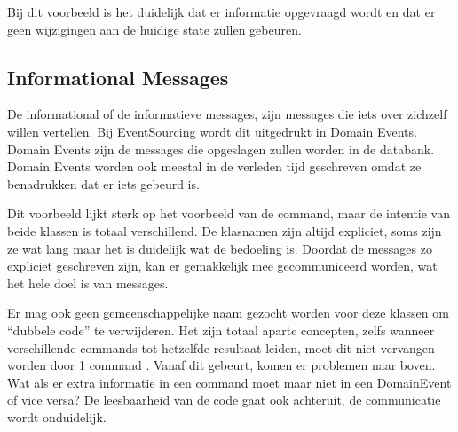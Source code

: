
Bij dit voorbeeld is het duidelijk dat er informatie opgevraagd wordt en dat er geen wijzigingen aan de huidige \gls{state} zullen gebeuren.

\subsection{Informational Messages}
\label{subsec:informational-messages}

De informational of de informatieve messages, zijn messages die iets over zichzelf willen vertellen. Bij EventSourcing wordt dit uitgedrukt in Domain Events. Domain Events zijn de messages die opgeslagen zullen worden in de databank. Domain Events worden ook meestal in de verleden tijd geschreven omdat ze benadrukken dat er iets gebeurd is.


Dit voorbeeld lijkt sterk op het voorbeeld van de \Gls{command}, maar de intentie van beide klassen is totaal verschillend. De klasnamen zijn altijd expliciet, soms zijn ze wat lang maar het is duidelijk wat de bedoeling is. Doordat de messages zo expliciet geschreven zijn, kan er gemakkelijk mee gecommuniceerd worden, wat het hele doel is van messages.

Er mag ook geen gemeenschappelijke naam gezocht worden voor deze klassen om ``dubbele code'' te verwijderen. Het zijn totaal aparte concepten, zelfs wanneer verschillende \Glspl{command} tot hetzelfde resultaat leiden, moet dit niet vervangen worden door 1 \Gls{command} \autocite{Verraes2014DDDLinguistic}. Vanaf dit gebeurt, komen er problemen naar boven. Wat als er extra informatie in een \Gls{command} moet maar niet in een DomainEvent of vice versa? De leesbaarheid van de code gaat ook achteruit, de communicatie wordt onduidelijk.
